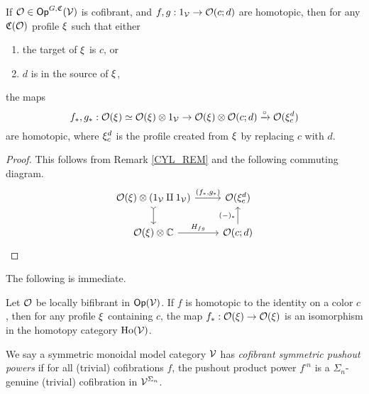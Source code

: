 \documentclass[a4paper,10pt
,draft
]{article}%
\renewcommand{\1}{\ensuremath{\mathbb{id}}}
\begin{document}
\begin{lemma}
      If $\mathcal{O} \in \mathsf{Op}^{G, \mathfrak C}(\mathcal V)$ is cofibrant,
      and $f,g: 1_{\mathcal V} \to \mathcal{O}(c;d)$ are homotopic, then for any $\mathfrak C(\mathcal{O})$ profile $\xi$ such that either
      \begin{enumerate}[label = (\roman*)]
      \item the target of $\xi$ is $c$, or
      \item $d$ is in the source of $\xi$,
      \end{enumerate}
      the maps
      \begin{equation}
            f_{\**}, g_{\**}: \O(\ksi) \simeq \O(\ksi) \otimes 1_\V \to \O(\ksi) \otimes \O(c;d) \xrightarrow{\circ} \O(\ksi_c^d)
      \end{equation}
      are homotopic,
      where $\xi_c^d$ is the profile created from $\xi$ by replacing $c$ with $d$.
\end{lemma}
\begin{proof}
      This follows from Remark \ref{CYL_REM} and the following commuting diagram.
      \begin{equation}
            \begin{tikzcd}
                  \O(\ksi) \otimes (1_\V \amalg 1_\V) \arrow[r, "{(f_{\**}, g_{\**})}"] \arrow[d, tail]
                  &
                  \O(\ksi_c^d)
                  \\
                  \O(\ksi) \otimes \mathbb C \arrow[r, "H_{fg}"]
                  &
                  \O(c;d) \arrow[u, "{(-)_{\**}}"]
            \end{tikzcd}
      \end{equation}
\end{proof}

The following is immediate.
\begin{corollary}
      \label{HTPIC_ISO_COR}
      Let $\mathcal{O}$ be locally bifibrant in $\mathsf{Op}(\mathcal V)$. 
      If $f$ is homotopic to the identity on a color $c$, then for any profile $\xi$ containing $c$, the map
      $f_{\**}: \O(\ksi) \to \O(\ksi)$
     is an isomorphism in the homotopy category $\operatorname{Ho}(\mathcal V)$.
\end{corollary}




\begin{definition}[{cf. \cite[Defn 6.16]{BP17}}]
        We say a symmetric monoidal model category $\mathcal V$ has \textit{cofibrant symmetric pushout powers} if
        for all (trivial) cofibrations $f$, the pushout product power $f^{\square n}$
        is a $\Sigma_n$-genuine (trivial) cofibration in $\mathcal V^{\Sigma_n}$. 
\end{definition}
\end{document}
